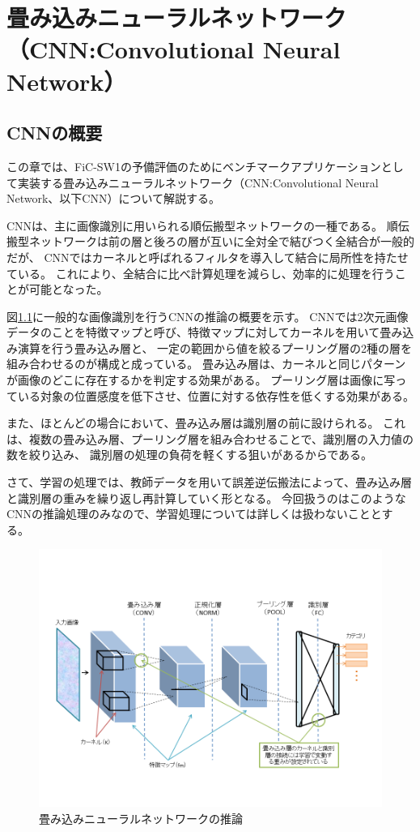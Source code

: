 \chapter{畳み込みニューラルネットワーク（CNN:Convolutional Neural Network）}
\section{CNNの概要}
この章では、FiC-SW1の予備評価のためにベンチマークアプリケーションとして実装する畳み込みニューラルネットワーク（CNN:Convolutional Neural Network、以下CNN）について解説する。

CNNは、主に画像識別に用いられる順伝搬型ネットワークの一種である。
順伝搬型ネットワークは前の層と後ろの層が互いに全対全で結びつく全結合が一般的だが、
CNNではカーネルと呼ばれるフィルタを導入して結合に局所性を持たせている。
これにより、全結合に比べ計算処理を減らし、効率的に処理を行うことが可能となった。

図\ref{fig_cnn}に一般的な画像識別を行うCNNの推論の概要を示す。
CNNでは2次元画像データのことを特徴マップと呼び、特徴マップに対してカーネルを用いて畳み込み演算を行う畳み込み層と、
一定の範囲から値を絞るプーリング層の2種の層を組み合わせるのが構成と成っている。
畳み込み層は、カーネルと同じパターンが画像のどこに存在するかを判定する効果がある。
プーリング層は画像に写っている対象の位置感度を低下させ、位置に対する依存性を低くする効果がある。

また、ほとんどの場合において、畳み込み層は識別層の前に設けられる。
これは、複数の畳み込み層、プーリング層を組み合わせることで、識別層の入力値の数を絞り込み、
識別層の処理の負荷を軽くする狙いがあるからである。

さて、学習の処理では、教師データを用いて誤差逆伝搬法によって、畳み込み層と識別層の重みを繰り返し再計算していく形となる。
今回扱うのはこのようなCNNの推論処理のみなので、学習処理については詳しくは扱わないこととする。

\begin{figure}[ht]  
 \begin{center}   
	\includegraphics[width=1.0\columnwidth,bb=0 0 720 540]{img/cnn.png}
    \caption{畳み込みニューラルネットワークの推論}
  \label{fig_cnn}  
 \end{center}  
\end{figure}


